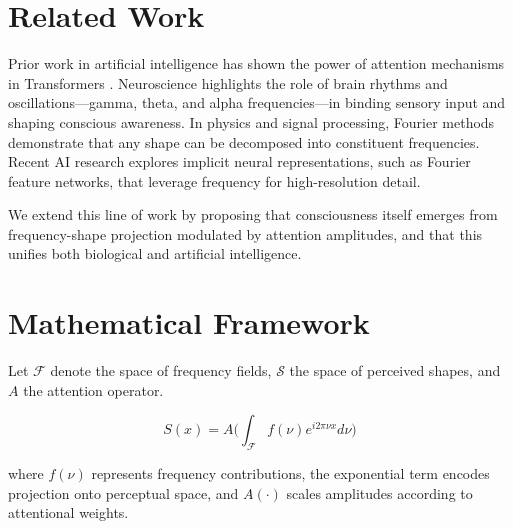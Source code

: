 \documentclass[12pt]{article}
\begin{document}
\section{Related Work}

Prior work in artificial intelligence has shown the power of attention mechanisms in Transformers \citep{vaswani2017attention}. Neuroscience highlights the role of brain rhythms and oscillations—gamma, theta, and alpha frequencies—in binding sensory input and shaping conscious awareness. In physics and signal processing, Fourier methods demonstrate that any shape can be decomposed into constituent frequencies. Recent AI research explores implicit neural representations, such as Fourier feature networks, that leverage frequency for high-resolution detail. 

We extend this line of work by proposing that consciousness itself emerges from frequency-shape projection modulated by attention amplitudes, and that this unifies both biological and artificial intelligence.

\section{Mathematical Framework}

Let $\mathcal{F}$ denote the space of frequency fields, $\mathcal{S}$ the space of perceived shapes, and $A$ the attention operator.

\begin{equation}
S(x) = A\bigg(\int_{\mathcal{F}} f(\nu) e^{i2\pi \nu x} d\nu \bigg)
\end{equation}

where $f(\nu)$ represents frequency contributions, the exponential term encodes projection onto perceptual space, and $A(\cdot)$ scales amplitudes according to attentional weights.
\end{document}
